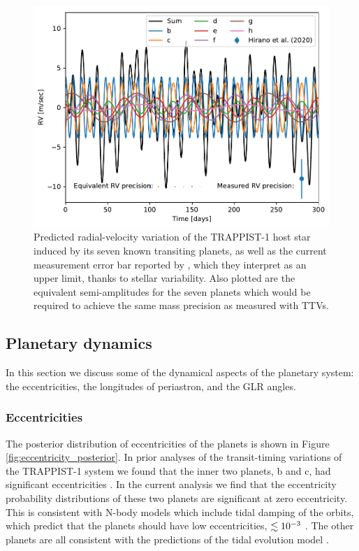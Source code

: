 \documentclass[twocolumn]{aastex63}
\begin{document}
\begin{figure}
    \centering
    \includegraphics[width=\hsize]{figures/Equivalent_RV_precision.pdf}
    \caption{Predicted radial-velocity variation of the TRAPPIST-1 host star
    induced by its seven known transiting planets, as well as the current
    measurement error bar reported by \citet{Hirano2020}, which they interpret
    as an upper limit, thanks to stellar variability.  Also plotted are
    the equivalent semi-amplitudes for the seven planets which would be required
    to achieve the same mass precision as measured with TTVs.}
    \label{fig:rv_forecast}
\end{figure}

\subsection{Planetary dynamics}



In this section we discuss some of the dynamical aspects of the planetary system: the  eccentricities, the longitudes of periastron, and the GLR angles. 

\subsubsection{Eccentricities}

The posterior distribution of eccentricities of the planets is shown
in Figure \ref{fig:eccentricity_posterior}.  In prior analyses of
the transit-timing variations of the TRAPPIST-1 system we found that
the inner two planets, b and c, had significant eccentricities \citep{Grimm2018}.
In the current analysis we find that the eccentricity probability
distributions of these two planets are significant at zero eccentricity.
This is consistent with N-body models which include tidal damping of
the orbits, which predict that the planets should have low eccentricities,
$\lesssim 10^{-3}$ \citep{Luger2017a,Turbet2018}.  The other planets are
all consistent with the predictions of the tidal evolution model
\citep{Luger2017b}. 
\end{document}
